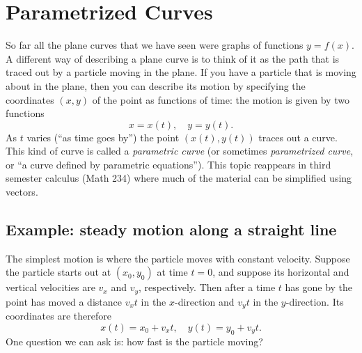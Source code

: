 \section{Parametrized Curves} %
\label{sec:05parametrized-curves-and-lHopital}
So far all the plane curves that we have seen were graphs of
functions $y=f(x)$.  A different way of describing a plane curve is to think of it as the
path that is traced out by a particle moving in the plane.  If you have a particle
that is moving about in the plane, then you can describe its motion by
specifying the coordinates $(x, y)$ of the point as functions of time: the
motion is given by two functions
\[
x = x(t), \quad y=y(t).
\]%
\marginpar{ }%
As $t$ varies (``as time goes by'') the point $(x(t), y(t))$ traces out a curve.
This kind of curve is called a \emph{parametric curve} (or sometimes
\textit{parametrized curve}, or ``a curve defined by parametric equations'').
This topic reappears in third semester calculus (Math 234) where much of the
material can be simplified using vectors.




\subsection{Example: steady motion along a straight line} %
The simplest motion is where the particle moves with constant velocity.
Suppose the particle starts out at $(x_0, y_0)$ at time $t=0$, and
suppose its horizontal and vertical velocities are $v_x$ and $v_y$,
respectively.  Then after a time $t$ has gone by the point has moved a
distance $v_x t$ in the $x$-direction and $v_y t$ in the
$y$-direction.  Its coordinates are therefore
\begin{equation}
  x(t) = x_0 + v_x t, \quad
  y(t) = y_0 + v_y t.
  \label{eq:05motion-on-line}
\end{equation}
One question we can ask is: how fast is the particle moving?


